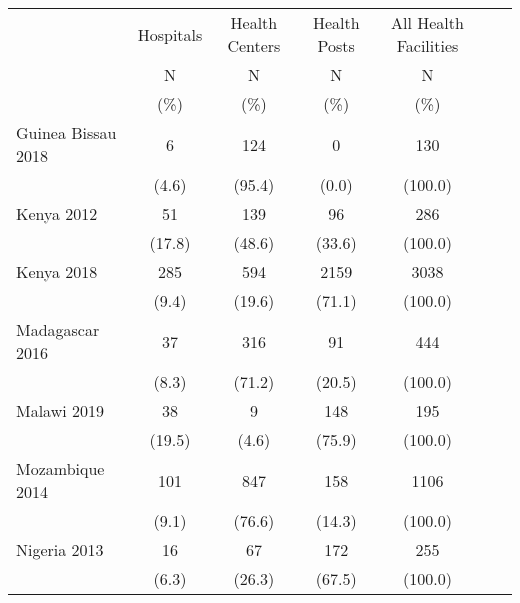 \def\sym#1{\ifmmode^{#1}\else\(^{#1}\)\fi}
\begin{tabular}{l*{6}{c}}
\hline\hline
               &\multicolumn{1}{c}{Hospitals}&\multicolumn{1}{c}{Health Centers}&\multicolumn{1}{c}{Health Posts}&\multicolumn{1}{c}{All Health Facilities}&\\
               &       N&                     N&       N&                                       N\\
               &     (\%)&                 (\%)&    (\%)&                                     (\%)\\
\hline
Guinea Bissau 2018&            {6}&                {124}&          {0}&             {130}\\
&                                              {(4.6)}&      {(95.4)}&        {(0.0)}&           {(100.0)}\\
Kenya 2012&                            {51}&                {139}&          {96}&             {286}\\
&                                              {(17.8)}&      {(48.6)}&        {(33.6)}&           {(100.0)}\\
Kenya 2018&                    {285}&                {594}&          {2159}&             {3038}\\
&                                              {(9.4)}&      {(19.6)}&        {(71.1)}&           {(100.0)}\\
Madagascar 2016&               {37}&                {316}&          {91}&             {444}\\
&                                              {(8.3)}&      {(71.2)}&        {(20.5)}&           {(100.0)}\\
Malawi 2019&                   {38}&                {9}&          {148}&             {195}\\
&                                              {(19.5)}&      {(4.6)}&        {(75.9)}&           {(100.0)}\\
Mozambique 2014&               {101}&                {847}&          {158}&             {1106}\\
&                                              {(9.1)}&      {(76.6)}&        {(14.3)}&           {(100.0)}\\
Nigeria 2013&                  {16}&                {67}&          {172}&             {255}\\
&                                              {(6.3)}&      {(26.3)}&        {(67.5)}&           {(100.0)}\\

\end{tabular}
